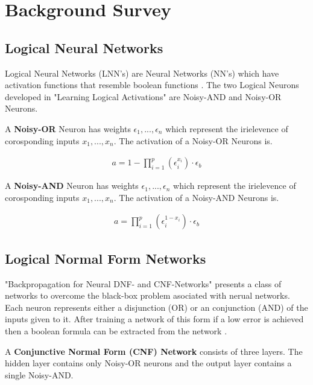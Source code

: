 \chapter{Background Survey}\label{C:backgroundsurvey}
\section{Logical Neural Networks}
Logical Neural Networks (LNN's) are Neural Networks (NN's) which have activation functions that resemble boolean functions \cite{LearningLogicalActivations}. The two Logical Neurons developed in "Learning Logical Activations" are Noisy-AND and Noisy-OR Neurons.

\begin{definition}
A \textbf{Noisy-OR} Neuron has weights $\epsilon_1, ..., \epsilon_n$ which represent the irielevence of corosponding inputs $x_1, ..., x_n$. The activation of a Noisy-OR Neurons is.

\begin{align}
a = 1 - \prod^p_{i=1} (\epsilon_i^{x_i}) \cdot \epsilon_b
\label{equ:noisy-or-activation-1}
\end{align}
\end{definition}

\begin{definition}
A \textbf{Noisy-AND} Neuron has weights $\epsilon_1, ..., \epsilon_n$ which represent the irielevence of corosponding inputs $x_1, ..., x_n$. The activation of a Noisy-AND Neurons is.

\begin{align}
a = \prod^p_{i=1} (\epsilon_i^{1 - x_i}) \cdot \epsilon_b
\label{equ:noisy-or-activation-1}
\end{align}
\end{definition}

\section{Logical Normal Form Networks}
"Backpropagation for Neural DNF- and CNF-Networks" presents a class of networks to overcome the black-box problem asociated with nerual networks. Each neuron represents either a disjunction (OR) or an conjunction (AND) of the inputs given to it. After training a network of this form if a low error is achieved then a boolean formula can be extracted from the network \cite{herrmann1996backpropagation}.

\begin{definition}
A \textbf{Conjunctive Normal Form (CNF) Network} consists of three layers. The hidden layer contains only Noisy-OR neurons and the output layer contains a single Noisy-AND.
\end{definition}

